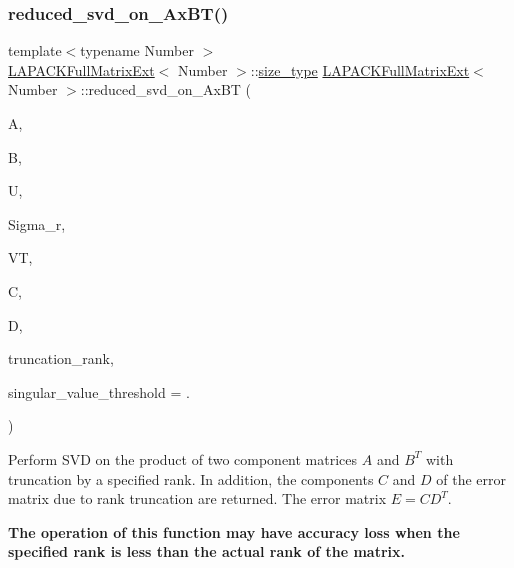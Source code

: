 \subsubsection{\texorpdfstring{reduced\+\_\+svd\+\_\+on\+\_\+\+Ax\+B\+T()}{reduced\_svd\_on\_AxBT()}\hspace{0.1cm}{\footnotesize\ttfamily [3/3]}}
{\footnotesize\ttfamily template$<$typename Number $>$ \\
\hyperlink{classLAPACKFullMatrixExt}{L\+A\+P\+A\+C\+K\+Full\+Matrix\+Ext}$<$ Number $>$\+::\hyperlink{classLAPACKFullMatrixExt_a5cf5f4a6104dc17029210b5ca52bf574}{size\+\_\+type} \hyperlink{classLAPACKFullMatrixExt}{L\+A\+P\+A\+C\+K\+Full\+Matrix\+Ext}$<$ Number $>$\+::reduced\+\_\+svd\+\_\+on\+\_\+\+Ax\+BT (\begin{DoxyParamCaption}\item[{\hyperlink{classLAPACKFullMatrixExt}{L\+A\+P\+A\+C\+K\+Full\+Matrix\+Ext}$<$ Number $>$ \&}]{A,  }\item[{\hyperlink{classLAPACKFullMatrixExt}{L\+A\+P\+A\+C\+K\+Full\+Matrix\+Ext}$<$ Number $>$ \&}]{B,  }\item[{\hyperlink{classLAPACKFullMatrixExt}{L\+A\+P\+A\+C\+K\+Full\+Matrix\+Ext}$<$ Number $>$ \&}]{U,  }\item[{std\+::vector$<$ typename numbers\+::\+Number\+Traits$<$ Number $>$\+::real\+\_\+type $>$ \&}]{Sigma\+\_\+r,  }\item[{\hyperlink{classLAPACKFullMatrixExt}{L\+A\+P\+A\+C\+K\+Full\+Matrix\+Ext}$<$ Number $>$ \&}]{VT,  }\item[{\hyperlink{classLAPACKFullMatrixExt}{L\+A\+P\+A\+C\+K\+Full\+Matrix\+Ext}$<$ Number $>$ \&}]{C,  }\item[{\hyperlink{classLAPACKFullMatrixExt}{L\+A\+P\+A\+C\+K\+Full\+Matrix\+Ext}$<$ Number $>$ \&}]{D,  }\item[{\hyperlink{classLAPACKFullMatrixExt_a5cf5f4a6104dc17029210b5ca52bf574}{size\+\_\+type}}]{truncation\+\_\+rank,  }\item[{Number}]{singular\+\_\+value\+\_\+threshold = {.} }\end{DoxyParamCaption})\hspace{0.3cm}{\ttfamily [static]}}

Perform S\+VD on the product of two component matrices $A$ and $B^T$ with truncation by a specified rank. In addition, the components $C$ and $D$ of the error matrix due to rank truncation are returned. The error matrix $E = CD^T$.

{\bfseries The operation of this function may have accuracy loss when the specified rank is less than the actual rank of the matrix.}

